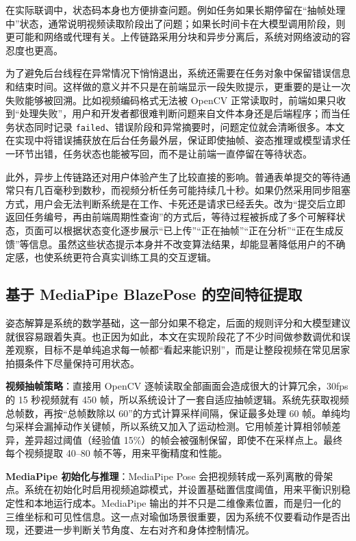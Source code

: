 在实际联调中，状态码本身也方便排查问题。例如任务如果长期停留在“抽帧处理中”状态，通常说明视频读取阶段出了问题；如果长时间卡在大模型调用阶段，则更可能和网络或代理有关。上传链路采用分块和异步分离后，系统对网络波动的容忍度也更高。

为了避免后台线程在异常情况下悄悄退出，系统还需要在任务对象中保留错误信息和结束时间。这样做的意义并不只是在前端显示一段失败提示，更重要的是让一次失败能够被回溯。比如视频编码格式无法被 OpenCV 正常读取时，前端如果只收到“处理失败”，用户和开发者都很难判断问题来自文件本身还是后端程序；而当任务状态同时记录 \texttt{failed}、错误阶段和异常摘要时，问题定位就会清晰很多。本文在实现中将错误捕获放在后台任务最外层，保证即使抽帧、姿态推理或模型请求任一环节出错，任务状态也能被写回，而不是让前端一直停留在等待状态。

此外，异步上传链路还对用户体验产生了比较直接的影响。普通表单提交的等待通常只有几百毫秒到数秒，而视频分析任务可能持续几十秒。如果仍然采用同步阻塞方式，用户会无法判断系统是在工作、卡死还是请求已经丢失。改为“提交后立即返回任务编号，再由前端周期性查询”的方式后，等待过程被拆成了多个可解释状态，页面可以根据状态变化逐步展示“已上传”“正在抽帧”“正在分析”“正在生成反馈”等信息。虽然这些状态提示本身并不改变算法结果，却能显著降低用户的不确定感，也使系统更符合真实训练工具的交互逻辑。

\subsection{基于 MediaPipe BlazePose 的空间特征提取}
姿态解算是系统的数学基础，这一部分如果不稳定，后面的规则评分和大模型建议就很容易跟着失真。也正因为如此，本文在实现阶段花了不少时间做参数调优和误差观察，目标不是单纯追求每一帧都“看起来能识别”，而是让整段视频在常见居家拍摄条件下尽量保持可用状态。

\textbf{视频抽帧策略}：直接用 OpenCV 逐帧读取全部画面会造成很大的计算冗余，30fps 的 15 秒视频就有 450 帧，所以系统设计了一套自适应抽帧逻辑。系统先获取视频总帧数，再按“总帧数除以 60”的方式计算采样间隔，保证最多处理 60 帧。单纯均匀采样会漏掉动作关键帧，所以系统又加入了运动检测。它用帧差计算相邻帧差异，差异超过阈值（经验值 15\%）的帧会被强制保留，即使不在采样点上。最终每个视频提取 40--80 帧不等，用来平衡精度和性能。

\textbf{MediaPipe 初始化与推理}：MediaPipe Pose 会把视频转成一系列离散的骨架点。系统在初始化时启用视频追踪模式，并设置基础置信度阈值，用来平衡识别稳定性和本地运行成本。MediaPipe 输出的并不只是二维像素位置，而是归一化的三维坐标和可见性信息。这一点对瑜伽场景很重要，因为系统不仅要看动作是否出现，还要进一步判断关节角度、左右对齐和身体控制情况。


